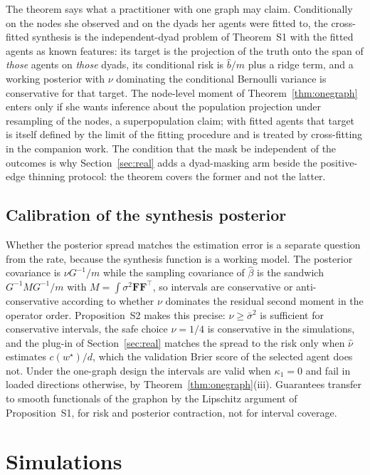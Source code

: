 \documentclass[12pt]{article}
\newcommand{\wstar}{w^{\star}}
\newcommand{\bhat}{\hat\beta}
\newcommand{\Fv}{\mathbf{F}}
\begin{document}
The theorem says what a practitioner with one graph may claim. Conditionally on the nodes she observed and on the dyads her agents were fitted to, the cross-fitted synthesis is the independent-dyad problem of Theorem~S1 with the fitted agents as known features: its target is the projection of the truth onto the span of \emph{those} agents on \emph{those} dyads, its conditional risk is $\hat b/m$ plus a ridge term, and a working posterior with $\nu$ dominating the conditional Bernoulli variance is conservative for that target. The node-level moment of Theorem~\ref{thm:onegraph} enters only if she wants inference about the population projection under resampling of the nodes, a superpopulation claim; with fitted agents that target is itself defined by the limit of the fitting procedure and is treated by cross-fitting in the companion work. The condition that the mask be independent of the outcomes is why Section~\ref{sec:real} adds a dyad-masking arm beside the positive-edge thinning protocol: the theorem covers the former and not the latter.

\subsection{Calibration of the synthesis posterior}
\label{sec:calibration}

Whether the posterior spread matches the estimation error is a separate question from the rate, because the synthesis function is a working model. The posterior covariance is $\nu G^{-1}/m$ while the sampling covariance of $\bhat$ is the sandwich $G^{-1}MG^{-1}/m$ with $M=\int\sigma^2\Fv\Fv^{\top}$, so intervals are conservative or anti-conservative according to whether $\nu$ dominates the residual second moment in the operator order. Proposition~S2 makes this precise: $\nu\ge\bar\sigma^2$ is sufficient for conservative intervals, the safe choice $\nu=1/4$ is conservative in the simulations, and the plug-in of Section~\ref{sec:real} matches the spread to the risk only when $\hat\nu$ estimates $c(\wstar)/d$, which the validation Brier score of the selected agent does not. Under the one-graph design the intervals are valid when $\kappa_1=0$ and fail in loaded directions otherwise, by Theorem~\ref{thm:onegraph}(iii). Guarantees transfer to smooth functionals of the graphon by the Lipschitz argument of Proposition~S1, for risk and posterior contraction, not for interval coverage.

\section{Simulations}
\label{sec:sims}
\end{document}
